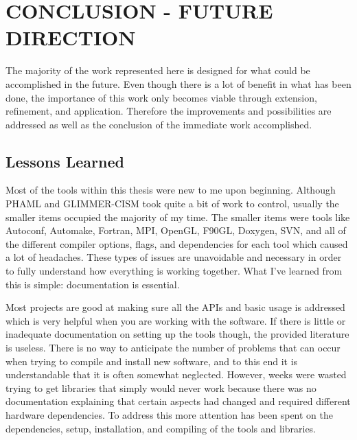 \chapter{CONCLUSION - FUTURE DIRECTION} \label{ch:conclusion}


The majority of the work represented here is designed for what could be accomplished in the future.  Even though there is a lot of benefit in what has been done, the importance of this work only becomes viable through extension, refinement, and application.  Therefore the improvements and possibilities are addressed as well as the conclusion of the immediate work accomplished.

\section{Lessons Learned}\label{sec:chp6lessons}

Most of the tools within this thesis were new to me upon beginning.  Although PHAML and GLIMMER-CISM took quite a bit of work to control, usually the smaller items occupied the majority of my time.  The smaller items were tools like Autoconf, Automake, Fortran, MPI, OpenGL, F90GL, Doxygen, SVN, and all of the different compiler options, flags, and dependencies for each tool which caused a lot of headaches.  These types of issues are unavoidable and necessary in order to fully understand how everything is working together.  What I've learned from this is simple:  documentation is essential.

Most projects are good at making sure all the APIs and basic usage is addressed which is very helpful when you are working with the software.  If there is little or inadequate documentation on setting up the tools though, the provided literature is useless.  There is no way to anticipate the number of problems that can occur when trying to compile and install new software, and to this end it is understandable that it is often somewhat neglected.  However, weeks were wasted trying to get libraries that simply would never work because there was no documentation explaining that certain aspects had changed and required different hardware dependencies.  To address this more attention has been spent on the dependencies, setup, installation, and compiling of the tools and libraries.

